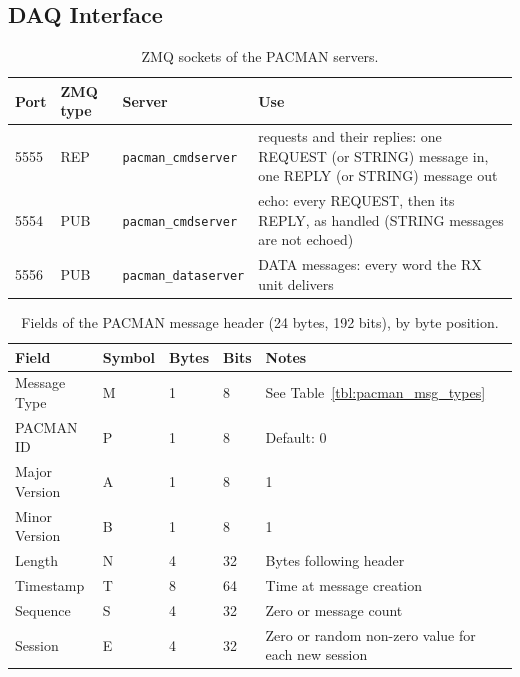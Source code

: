 \documentclass[12pt]{article}
\begin{document}
\subsection{DAQ Interface}\label{sec:daq-interface}

\begin{table}
\caption{\label{tbl:sockets} ZMQ sockets of the PACMAN servers.}
\begin{center}
\begin{tabular}{lll>{\raggedright\arraybackslash}p{9.6cm}}
Port & ZMQ type & Server & Use \\
\hline
5555 & REP & \texttt{pacman\_cmdserver} & requests and their replies:  one REQUEST (or STRING) message in, one
  REPLY (or STRING) message out \\
5554 & PUB & \texttt{pacman\_cmdserver} & echo:  every REQUEST, then its REPLY, as handled (STRING messages are
  not echoed) \\
5556 & PUB & \texttt{pacman\_dataserver} & DATA messages:  every word the RX unit delivers \\
\end{tabular}
\end{center}
\end{table}

\begin{table}[htbp]
\centering\small
\begin{tabular}{|lllll|p{6.2cm}|}
\hline
Field          & Symbol & Bytes & Bits & Notes \\
\hline
Message Type   & M      & 1 & 8  & See Table~\ref{tbl:pacman_msg_types}\\
PACMAN ID      & P      & 1 & 8  & Default: 0\\
Major Version  & A      & 1 & 8  & 1 \\
Minor Version  & B      & 1 & 8  & 1 \\
Length         & N      & 4 & 32 & Bytes following header \\
Timestamp      & T      & 8 & 64 & Time at message creation \\
Sequence       & S      & 4 & 32 & Zero or message count \\
Session        & E      & 4 & 32 & Zero or random non-zero value for each new session \\
\hline
\end{tabular}
\caption{Fields of the PACMAN message header (24 bytes, 192 bits), by
  byte position. }
\label{tbl:pacman_header_fields}
\end{table}
\end{document}
